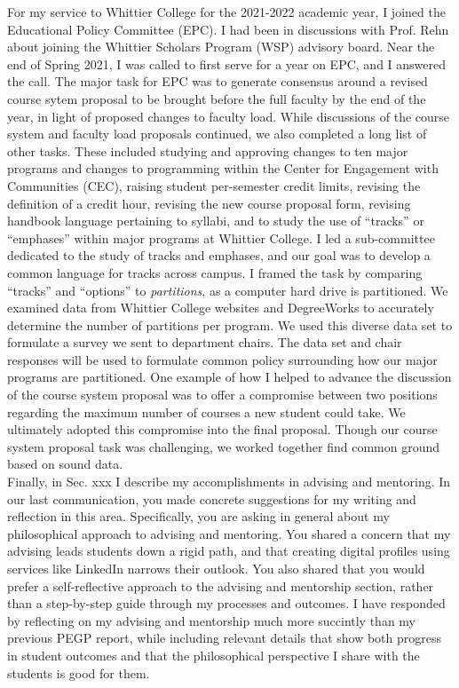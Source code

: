 \documentclass[../../main.tex]{subfiles}
\begin{document}
For my service to Whittier College for the 2021-2022 academic year, I joined the Educational Policy Committee (EPC).  I had been in discussions with Prof. Rehn about joining the Whittier Scholars Program (WSP) advisory board.  Near the end of Spring 2021, I was called to first serve for a year on EPC, and I answered the call.  The major task for EPC was to generate consensus around a revised course sytem proposal to be brought before the full faculty by the end of the year, in light of proposed changes to faculty load.  While discussions of the course system and faculty load proposals continued, we also completed a long list of other tasks.  These included studying and approving changes to ten major programs and changes to programming within the Center for Engagement with Communities (CEC), raising student per-semester credit limits, revising the definition of a credit hour, revising the new course proposal form, revising handbook language pertaining to syllabi, and to study the use of ``tracks'' or ``emphases'' within major programs at Whittier College.  I led a sub-committee dedicated to the study of tracks and emphases, and our goal was to develop a common language for tracks across campus.  I framed the task by comparing ``tracks'' and ``options'' to \textit{partitions}, as a computer hard drive is partitioned.  We examined data from Whittier College websites and DegreeWorks to accurately determine the number of partitions per program.  We used this diverse data set to formulate a survey we sent to department chairs.  The data set and chair responses will be used to formulate common policy surrounding how our major programs are partitioned.  One example of how I helped to advance the discussion of the course system proposal was to offer a compromise between two positions regarding the maximum number of courses a new student could take.  We ultimately adopted this compromise into the final proposal.  Though our course system proposal task was challenging, we worked together find common ground based on sound data.
\\
\vspace{0.25cm}
Finally, in Sec. xxx I describe my accomplishments in advising and mentoring.  In our last communication, you made concrete suggestions for my writing and reflection in this area.  Specifically, you are asking in general about my philosophical approach to advising and mentoring.  You shared a concern that my advising leads students down a rigid path, and that creating digital profiles using services like LinkedIn narrows their outlook.  You also shared that you would prefer a self-reflective approach to the advising and mentorship section, rather than a step-by-step guide through my processes and outcomes.  I have responded by reflecting on my advising and mentorship much more succintly than my previous PEGP report, while including relevant details that show both progress in student outcomes and that the philosophical perspective I share with the students is good for them.
\end{document}

